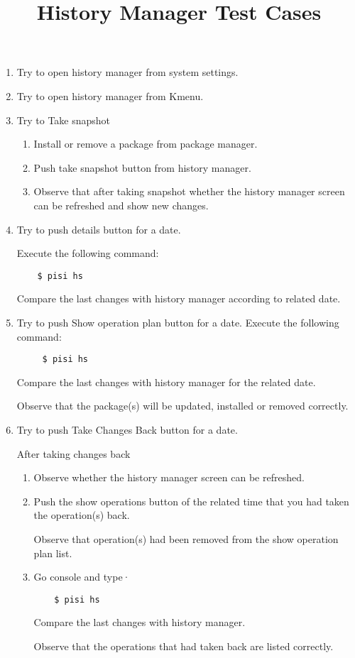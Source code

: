 \documentclass[a4paper,10pt]{article}
\title{History Manager Test Cases}
\begin{document}
\maketitle

\begin{enumerate}
\item Try to open history manager from system settings.
\item Try to open history manager from Kmenu.
\item Try to Take snapshot	
\begin{enumerate}
    \item Install or remove a package from package manager.
    \item Push take snapshot button from history manager.
    \item Observe that after taking snapshot whether the history manager screen can be refreshed and show new changes.
\end{enumerate}

\item Try to push details button for a date.

    Execute the following command:
\begin{verbatim}
    $ pisi hs
\end{verbatim} 

    Compare the last changes with history manager according to related date. 

\item Try to push Show operation plan button for a date.
    Execute the following command:
\begin{verbatim}
     $ pisi hs
\end{verbatim} 
    Compare the last changes with history manager for the related date.

    Observe that the package(s) will be updated, installed or removed correctly.

\item Try to push Take Changes Back button for a date.

        After taking changes back 
\begin{enumerate}
        \item Observe whether the history manager screen can be refreshed.
        \item Push the show operations button of the related time that you had taken the operation(s) back.

              Observe that operation(s) had been removed from the show operation plan list.
     	\item Go console and type·
\begin{verbatim}
    $ pisi hs
\end{verbatim} 

            Compare the last changes with history manager.

            Observe that the operations that had taken back are listed correctly.
\end{enumerate}
\end{enumerate}
\end{document}
